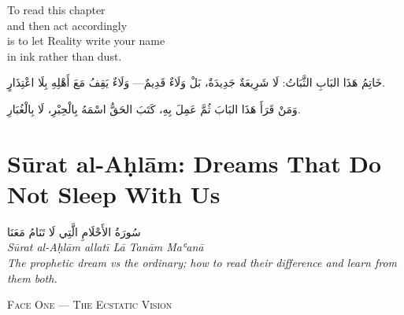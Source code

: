 \documentclass[11pt,a4paper,twoside]{book}
\begin{document}
To read this chapter\\
and then act accordingly\\
is to let Reality write your name\\
in ink rather than dust.

\begin{flushright}
{\arabicfont
خَاتِمُ هَذَا البَابِ الثَّبَاتُ:
لَا شَرِيعَةٌ جَدِيدَةٌ، بَلْ وَلَاءٌ قَدِيمٌ—
وَلَاءٌ يَقِفُ مَعَ أَهْلِهِ
بِلَا اعْتِذَارٍ.

وَمَنْ قَرَأَ هَذَا البَابَ
ثُمَّ عَمِلَ بِهِ،
كَتَبَ الحَقُّ اسْمَهُ
بِالْحِبْرِ، لَا بِالْغُبَارِ.}
\end{flushright}

\clearpage


\chapter*{Sūrat al-Aḥlām: Dreams That Do Not Sleep With Us}
\begin{center}
{\arabicfont\Large سُورَةُ الأَحْلَامِ الَّتِي لَا تَنَامُ مَعَنَا}\\[5pt]
{\small\itshape Sūrat al-Aḥlām allatī Lā Tanām Maʿanā}\\[1em]
{\color{sage}\itshape The prophetic dream vs the ordinary; how to read their difference and learn from them both.}
\end{center}

\vspace{1.5em}
\begin{center}
{\small\scshape Face One — The Ecstatic Vision}
\end{center}
\vspace{0.5em}
\end{document}
